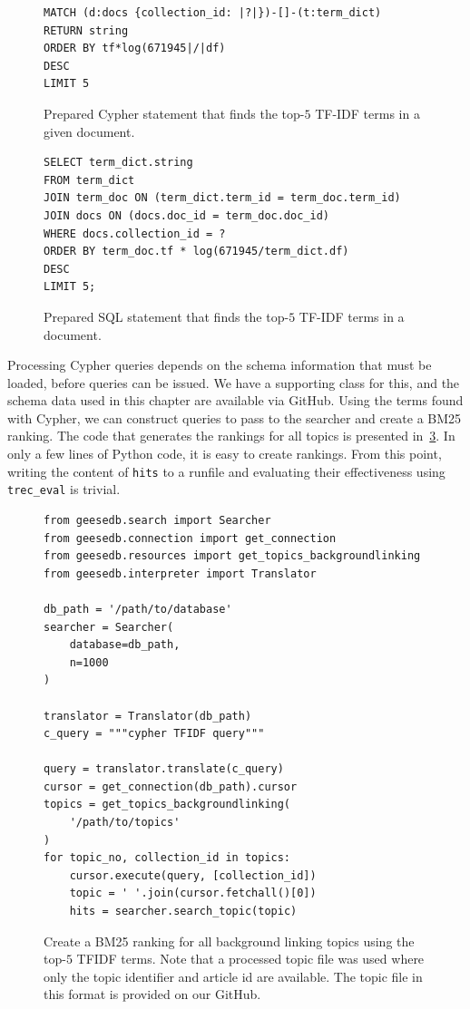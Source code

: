 \begin{figure}
	\begin{verbatim}
MATCH (d:docs {collection_id: |?|})-[]-(t:term_dict)
RETURN string
ORDER BY tf*log(671945|/|df)
DESC
LIMIT 5
	\end{verbatim}
	\caption{Prepared Cypher statement that finds the top-$5$ TF-IDF terms in a given document.}
	\label{fig:tfidf-cypher}
\end{figure}
\begin{figure}
	\begin{verbatim}
SELECT term_dict.string
FROM term_dict
JOIN term_doc ON (term_dict.term_id = term_doc.term_id)
JOIN docs ON (docs.doc_id = term_doc.doc_id)
WHERE docs.collection_id = ?
ORDER BY term_doc.tf * log(671945/term_dict.df)
DESC
LIMIT 5;
	\end{verbatim}
	\caption{Prepared SQL statement that finds the top-$5$ TF-IDF terms in a document.}
	\label{fig:tfidf}
\end{figure}
Processing Cypher queries depends on the schema information that must be loaded, before queries can be issued. We have a supporting class for this, and the schema data used in this chapter are available via GitHub. Using the terms found with Cypher, we can construct queries to pass to the searcher and create a BM25 ranking. The code that generates the rankings for all topics is presented in~\cref{fig:code_bm25_background_linking}. In only a few lines of Python code, it is easy to create rankings. From this point, writing the content of \texttt{hits} to a runfile and evaluating their effectiveness using \texttt{trec\_eval} is trivial. 

\begin{figure}
	\begin{verbatim}
from geesedb.search import Searcher
from geesedb.connection import get_connection
from geesedb.resources import get_topics_backgroundlinking
from geesedb.interpreter import Translator

db_path = '/path/to/database'
searcher = Searcher(
    database=db_path, 
    n=1000
)

translator = Translator(db_path)
c_query = """cypher TFIDF query"""

query = translator.translate(c_query)
cursor = get_connection(db_path).cursor
topics = get_topics_backgroundlinking(
    '/path/to/topics'
)
for topic_no, collection_id in topics:
    cursor.execute(query, [collection_id])
    topic = ' '.join(cursor.fetchall()[0])
    hits = searcher.search_topic(topic)
	\end{verbatim}
	\caption{Create a BM25 ranking for all background linking topics using the top-$5$ TFIDF terms. Note that a processed topic file was used where only the topic identifier and article id are available. The topic file in this format is provided on our GitHub.}
	\label{fig:code_bm25_background_linking}
\end{figure}

